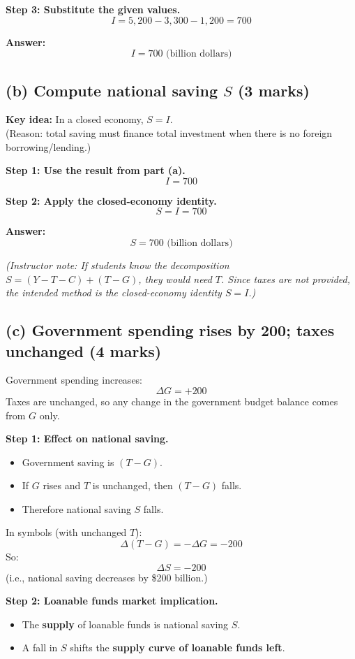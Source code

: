 \documentclass[12pt]{article}
\begin{document}
\textbf{Step 3: Substitute the given values.}
\[
I = 5{,}200 - 3{,}300 - 1{,}200 = 700
\]

\textbf{Answer:}
\[
\boxed{I = 700 \text{ (billion dollars)}}
\]

\subsection*{(b) Compute national saving \(S\) (3 marks)}

\textbf{Key idea:} In a closed economy, \(\boxed{S = I}\).\\
(Reason: total saving must finance total investment when there is no foreign borrowing/lending.)

\textbf{Step 1: Use the result from part (a).}
\[
I = 700
\]

\textbf{Step 2: Apply the closed-economy identity.}
\[
S = I = 700
\]

\textbf{Answer:}
\[
\boxed{S = 700 \text{ (billion dollars)}}
\]

\textit{(Instructor note: If students know the decomposition \(S = (Y-T-C) + (T-G)\), they would need \(T\). Since taxes are not provided, the intended method is the closed-economy identity \(S=I\).)}

\subsection*{(c) Government spending rises by 200; taxes unchanged (4 marks)}

Government spending increases:
\[
\Delta G = +200
\]
Taxes are unchanged, so any change in the government budget balance comes from \(G\) only.

\textbf{Step 1: Effect on national saving.}
\begin{itemize}
    \item Government saving is \((T-G)\).
    \item If \(G\) rises and \(T\) is unchanged, then \((T-G)\) falls.
    \item Therefore national saving \(S\) falls.
\end{itemize}
In symbols (with unchanged \(T\)):
\[
\Delta (T-G) = -\Delta G = -200
\]
So:
\[
\boxed{\Delta S = -200}
\]
(i.e., national saving decreases by \$200 billion.)

\textbf{Step 2: Loanable funds market implication.}
\begin{itemize}
    \item The \textbf{supply} of loanable funds is national saving \(S\).
    \item A fall in \(S\) shifts the \textbf{supply curve of loanable funds left}.
\end{itemize}
\end{document}
